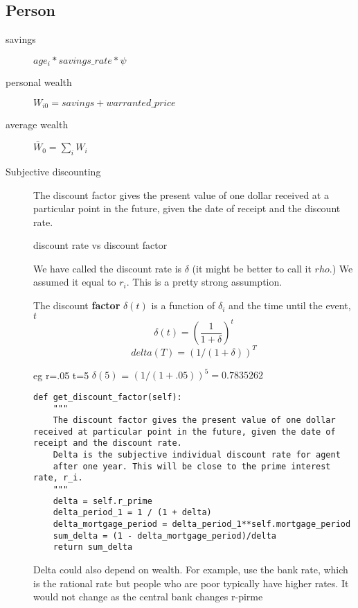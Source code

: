 \subsection{Person}
\begin{description}
\item [savings] $age_i*savings\_rate*\psi$
\item[personal wealth] $W_{i0}= savings + warranted\_price $
\item[average wealth] $\bar W_{0}= \sum_i W_i$
\item[Subjective discounting] The discount factor gives the present value of one dollar received at a particular point in the future, given the date of receipt and the discount rate.

{discount rate vs discount factor}

We have called the  discount rate is $\delta$ (it might be better to call it $rho$.) We assumed it equal to $r_i$. This is a pretty strong assumption.

The discount \textbf{factor} $\delta(t)$ is a function of $\delta_i$ and the time until the event, $t$
\[\delta(t)=\left(\frac{1}{1+\delta}\right)^t\]
\[delta(T)=  (1/(1+\delta))^T\]   
    

eg r=.05  t=5  $\delta(5)$ =  $(1/(1+.05))^5 = 0.7835262$


\begin{lstlisting}
def get_discount_factor(self):
    """
    The discount factor gives the present value of one dollar received at particular point in the future, given the date of receipt and the discount rate.
    Delta is the subjective individual discount rate for agent
    after one year. This will be close to the prime interest rate, r_i.
    """    
    delta = self.r_prime
    delta_period_1 = 1 / (1 + delta) 
    delta_mortgage_period = delta_period_1**self.mortgage_period
    sum_delta = (1 - delta_mortgage_period)/delta
    return sum_delta
\end{lstlisting}
Delta could also depend on wealth. For example,  use the bank rate, which is the rational rate but people who are poor typically have higher rates.  It would not change as the central bank changes r-pirme



\end{description}
